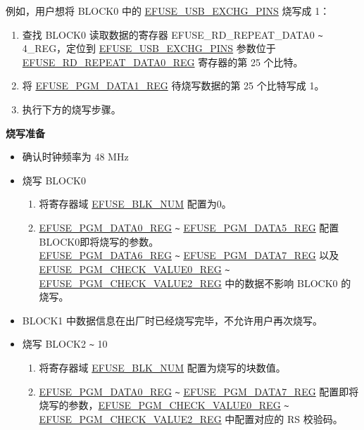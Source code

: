 \documentclass[main\_\_CN.tex]{subfiles}
\begin{document}
例如，用户想将 BLOCK0 中的 \hyperref[fielddesc:EFUSEUSBEXCHGPINS]{EFUSE\_USB\_EXCHG\_PINS} 烧写成 1：

\begin{enumerate}
    \item 查找 BLOCK0 读取数据的寄存器 EFUSE\_RD\_REPEAT\_DATA0 \verb+~+ 4\_REG，定位到 \hyperref[fielddesc:EFUSEUSBEXCHGPINS]{EFUSE\_USB\_EXCHG\_PINS} 参数位于 \hyperref[regdesc:EFUSERDREPEATDATA0REG]{EFUSE\_RD\_REPEAT\_DATA0\_REG} 寄存器的第 25 个比特。
    \item 将 \hyperref[regdesc:EFUSEPGMDATANREG]{EFUSE\_PGM\_DATA1\_REG} 待烧写数据的第 25 个比特写成 1。
    \item 执行下方的烧写步骤。
\end{enumerate}

{\bfseries 烧写准备}

\begin{itemize}
    \item 确认时钟频率为 48 MHz
    \item 烧写 BLOCK0
    \begin{enumerate}
        \item 将寄存器域 \hyperref[fielddesc:EFUSEBLKNUM]{EFUSE\_BLK\_NUM} 配置为0。
        \item \hyperref[regdesc:EFUSEPGMDATANREG]{EFUSE\_PGM\_DATA0\_REG} \verb+~+ \hyperref[regdesc:EFUSEPGMDATANREG]{EFUSE\_PGM\_DATA5\_REG} 配置BLOCK0即将烧写的参数。\\
        \hyperref[regdesc:EFUSEPGMDATANREG]{EFUSE\_PGM\_DATA6\_REG} \verb+~+ \hyperref[regdesc:EFUSEPGMDATANREG]{EFUSE\_PGM\_DATA7\_REG} 以及\\ \hyperref[regdesc:EFUSEPGMCHECKVALUENREG]{EFUSE\_PGM\_CHECK\_VALUE0\_REG} \verb+~+ \hyperref[regdesc:EFUSEPGMCHECKVALUENREG]{EFUSE\_PGM\_CHECK\_VALUE2\_REG} 中的数据不影响 BLOCK0 的烧写。
    \end{enumerate}
    \item BLOCK1 中数据信息在出厂时已经烧写完毕，不允许用户再次烧写。
    \item 烧写 BLOCK2 \verb+~+ 10
    \begin{enumerate}
        \item 将寄存器域 \hyperref[fielddesc:EFUSEBLKNUM]{EFUSE\_BLK\_NUM} 配置为烧写的块数值。
        \item \hyperref[regdesc:EFUSEPGMDATANREG]{EFUSE\_PGM\_DATA0\_REG} \verb+~+ \hyperref[regdesc:EFUSEPGMDATANREG]{EFUSE\_PGM\_DATA7\_REG} 配置即将烧写的参数，\hyperref[regdesc:EFUSEPGMCHECKVALUENREG]{EFUSE\_PGM\_CHECK\_VALUE0\_REG}  \verb+~+ \hyperref[regdesc:EFUSEPGMCHECKVALUENREG]{EFUSE\_PGM\_CHECK\_VALUE2\_REG} 中配置对应的 RS 校验码。
    \end{enumerate}
\end{itemize}
\end{document}
